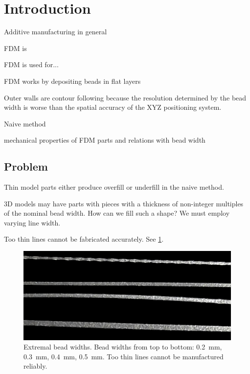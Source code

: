 \section{Introduction}
Additive manufacturing in general

FDM is

FDM is used for...

FDM works by depositing beads in flat layers

Outer walls are contour following because the resolution determined by the bead width is worse than the spatial accuracy of the XYZ positioning system.

Naive method

mechanical properties of FDM parts and relations with bead width




\subsection{Problem}
Thin model parts either produce overfill or underfill in the naive method.

3D models may have parts with pieces with a thickness of non-integer multiples of the nominal bead width.
How can we fill such a shape?
We must employ varying line width.

Too thin lines cannot be fabricated accurately. 
See \cref{extremal_bead_widths}.

\begin{figure}
\centering
\setlength{\figwidth}{.4\columnwidth}
\includegraphics[width=\columnwidth]{sources/intro/thin_extrusion.jpg}
\caption{
Extremal bead widths.
Bead widths from top to bottom: \SI{0.2}{\milli\meter}, \SI{0.3}{\milli\meter}, \SI{0.4}{\milli\meter}, \SI{0.5}{\milli\meter}.
Too thin lines cannot be manufactured reliably.
}
\label{extremal_bead_widths}
\end{figure}



